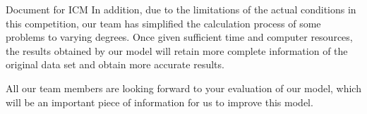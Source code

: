 \documentclass[12pt]{article}  %
\begin{document}
\begin{letter}{Document for ICM}
In addition, due to the limitations of the actual conditions in this competition, our team has simplified the calculation process of some problems to varying degrees. Once given sufficient time and computer resources, the results obtained by our model will retain more complete information of the original data set and obtain more accurate results.\par

All our team members are looking forward to your evaluation of our model, which will be an important piece of information for us to improve this model.\par

\end{letter}
\newpage




\end{document}

